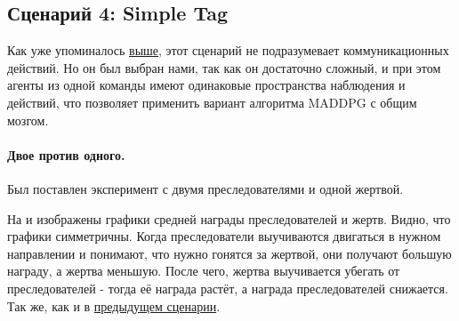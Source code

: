 \subsection{Сценарий 4: Simple Tag}

Как уже упоминалось \hyperref[exp-st]{выше}, этот сценарий не подразумевает коммуникационных действий. Но он был выбран нами, так как он достаточно сложный, и при этом агенты из одной команды имеют одинаковые пространства наблюдения и действий, что позволяет применить вариант алгоритма MADDPG с общим мозгом.

\paragraph{Двое против одного.}

Был поставлен эксперимент с двумя преследователями и одной жертвой.

На  и  изображены графики средней награды преследователей и жертв. Видно, что графики симметричны. Когда преследователи выучиваются двигаться в нужном направлении и понимают, что нужно гонятся за жертвой, они получают большую награду, а жертва меньшую. После чего, жертва выучивается убегать от преследователей - тогда её награда растёт, а награда преследователей снижается. Так же, как и в \hyperref[exp-results-svc]{предыдущем сценарии}.

